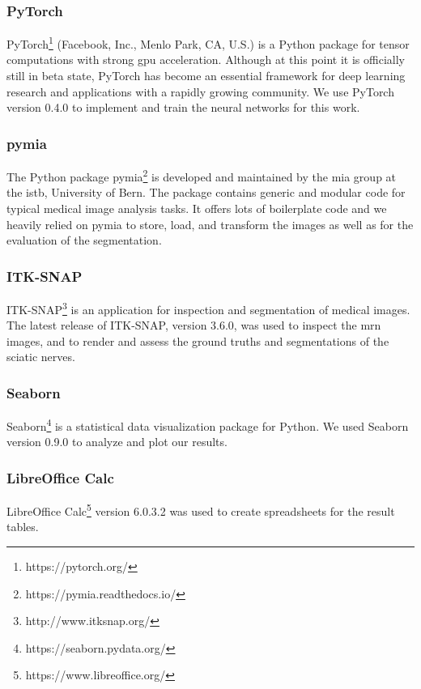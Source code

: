 \subsubsection{PyTorch}
PyTorch\footnote{https://pytorch.org/} (Facebook, Inc., Menlo Park, CA, U.S.) is a Python package for tensor computations with strong \gls{gpu} acceleration. Although at this point it is officially still in beta state, PyTorch has become an essential framework for deep learning research and applications with a rapidly growing community. We use PyTorch version 0.4.0 to implement and train the neural networks for this work.
\subsubsection{pymia}
The Python package pymia\footnote{https://pymia.readthedocs.io/} is developed and maintained by the \gls{mia} group at the \gls{istb}, University of Bern. The package contains generic and modular code for typical medical image analysis tasks. It offers lots of boilerplate code and we heavily relied on pymia to store, load, and transform the images as well as for the evaluation of the segmentation.
\subsubsection{ITK-SNAP}
ITK-SNAP\footnote{http://www.itksnap.org/} \cite{py06nimg} is an application for inspection and segmentation of medical images. The latest release of ITK-SNAP, version 3.6.0, was used to inspect the \gls{mrn} images, and to render and assess the ground truths and segmentations of the sciatic nerves.
\subsubsection{Seaborn}
Seaborn\footnote{https://seaborn.pydata.org/} is a statistical data visualization package for Python. We used Seaborn version 0.9.0 to analyze and plot our results.
\subsubsection{LibreOffice Calc}
LibreOffice Calc\footnote{https://www.libreoffice.org/} version 6.0.3.2 was used to create spreadsheets for the result tables.

